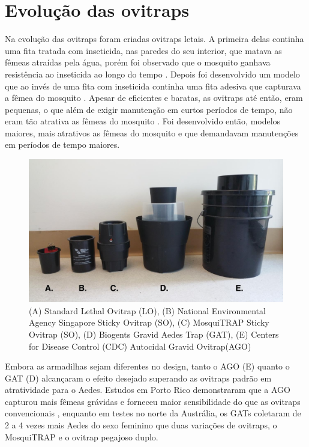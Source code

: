 \documentclass[
	12pt,				%
	openright,			%
	oneside,			%
	a4paper,			%
	chapter=TITLE,		%
	english,			%
	brazil				%
	]{abntex2}
\begin{document}
\section{Evolução das ovitraps}

Na evolução das ovitraps foram criadas ovitraps letais. A primeira delas continha uma fita
tratada com inseticida, nas paredes do seu interior, que matava as fêmeas atraídas pela
água, porém foi observado que o mosquito ganhava resistência ao inseticida ao longo do
tempo \cite{BRIANJJOHNSON2017}. Depois foi desenvolvido um modelo que ao invés de uma fita com inseticida
continha uma fita adesiva que capturava a fêmea do mosquito \cite{BRIANJJOHNSON2017}. Apesar de eficientes e 
baratas, as ovitraps até então, eram pequenas, o que além de exigir manutenção em curtos
períodos de tempo, não eram tão atrativa as fêmeas do mosquito \cite{BRIANJJOHNSON2017}. Foi desenvolvido
então, modelos maiores, mais atrativos as fêmeas do mosquito e que demandavam
manutenções em períodos de tempo maiores.

\begin{figure}[h!]
\centering
\includegraphics[scale=0.3]{imagens/exemplosovitraps.png}
 \caption{(A) Standard Lethal Ovitrap (LO), (B) National Environmental Agency Singapore Sticky Ovitrap (SO), (C) MosquiTRAP Sticky Ovitrap (SO), (D) Biogents Gravid Aedes Trap (GAT), (E) Centers for Disease Control (CDC) Autocidal Gravid Ovitrap(AGO)}
    \label{fig:evolucaoOvitraps}
\end{figure}

Embora as armadilhas sejam diferentes no design, tanto o AGO (E) quanto o GAT (D)
alcançaram o efeito desejado superando as ovitraps padrão em atratividade para o Aedes.
Estudos em Porto Rico demonstraram que a AGO capturou mais fêmeas grávidas e
forneceu maior sensibilidade do que as ovitraps convencionais \cite{BRIANJJOHNSON2017}, enquanto em testes no norte da Austrália, os GATs coletaram de 2 a 4 vezes mais Aedes do sexo feminino que
duas variações de ovitraps, o MosquiTRAP e o ovitrap pegajoso duplo.
\end{document}

